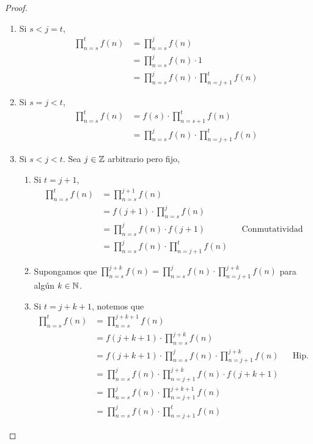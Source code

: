\begin{enumerate}[label=\alph*)]
\begin{proof}
\begin{enumerate}[label=\Roman*)]
        \item Si $s<j=t$,
        \begin{align*}
          \prod_{n=s}^{t} f(n) &= \prod_{n=s}^{j} f(n)\\
          &= \prod_{n=s}^{j} f(n) \cdot 1\\
          &= \prod_{n=s}^{j} f(n) \cdot \prod_{n=j+1}^{t} f(n)
        \end{align*}
        
        \item Si $s=j<t$,
        \begin{align*}
          \prod_{n=s}^{t} f(n) &= f(s) \cdot \prod_{n=s+1}^{t} f(n)\\
          &= \prod_{n=s}^{j} f(n) \cdot \prod_{n=j+1}^{t} f(n)
        \end{align*}
        
        \item Si $s<j<t$. Sea $j\in \mathbb{Z}$ arbitrario pero fijo,
        \begin{enumerate}[label=\roman*)]
          \item Si $t=j+1$,
          \begin{align*}
            \prod_{n=s}^{t} f(n) &=\prod_{n=s}^{j+1} f(n) \\
            &= f(j+1) \cdot \prod_{n=s}^{j} f(n)\\
            &= \prod_{n=s}^{j} f(n) \cdot f(j+1) && \text{Conmutatividad}\\
            &= \prod_{n=s}^{j} f(n) \cdot \prod_{n=j+1}^{t} f(n)
          \end{align*}
          
          \item Supongamos que $\prod_{n=s}^{j+k} f(n) = \prod_{n=s}^{j} f(n) \cdot \prod_{n=j+1}^{j+k} f(n)$ para algún $k\in \mathbb{N}$.
          \item Si $t=j+k+1$, notemos que
          \begin{align*}
            \prod_{n=s}^{t} f(n) &= \prod_{n=s}^{j+k+1} f(n)\\
            &= f(j+k+1) \cdot \prod_{n=s}^{j+k} f(n)\\
            &= f(j+k+1) \cdot \prod_{n=s}^{j} f(n) \cdot \prod_{n=j+1}^{j+k} f(n)&& \text{Hip. Ind.}\\
            &= \prod_{n=s}^{j} f(n) \cdot \prod_{n=j+1}^{j+k} f(n) \cdot f(j+k+1)\\
            &= \prod_{n=s}^{j} f(n) \cdot \prod_{n=j+1}^{j+k+1} f(n)\\
            &= \prod_{n=s}^{j} f(n) \cdot \prod_{n=j+1}^{t} f(n)
          \end{align*}
        \end{enumerate}
      \end{enumerate}
    \end{proof}
    

\end{enumerate}
